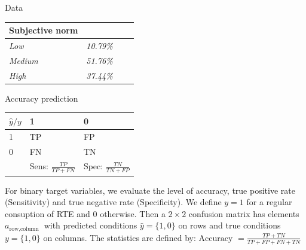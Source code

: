 \documentclass[12pt]{beamer}
\begin{document}
\begin{frame}{Data}
\begin{table}[H]
\begin{tabular}{l|l|l|l}
			\textbf{Subjective norm}          & \textit{}          & \textbf{}                 & \textit{}          \\ \hline
			\textit{Low}                      & \textit{10.79\%}      & \textit{}                                   & \textit{}      \\ \hline
			\textit{Medium}                   & \textit{51.76\%}      & \textit{}                                    & \textit{}      \\ \hline
			\textit{High}                     & \textit{37.44\%}      &                                                & \textit{}          \\ \hline
			
		\end{tabular}
		
		\label{table:statistics}
	\end{table}
\end{frame}




\begin{frame}{Accuracy prediction}
	\scriptsize
\begin{table}[]
	\begin{tabular}{|l|l|l|}
		\hline
		$\hat{y}/y$ & 1                         & 0                         \\ \hline
		1           & TP                        & FP                        \\ \hline
		0           & FN                        & TN                        \\ \hline
		& Sens: $\frac{TP}{TP+FN}$ & Spec: $\frac{TN}{TN+FP}$ \\ \hline
	\end{tabular}
\end{table}
	
For binary target variables, we evaluate the level of accuracy, true positive rate (Sensitivity) and true negative rate (Specificity). We define  $y=1$ for a regular consuption of RTE and 0 otherwise. Then a $2 \times 2$ confusion matrix has elements $a_{\text {row,column }}$ with predicted conditions $\widehat{y}=\{1,0\}$ on rows and true conditions $y=\{1,0\}$ on columns. The statistics are defined by: $\text{Accuracy }=\frac{TP+TN}{TP+FP+FN+TN}$

\end{frame}
\end{document}
